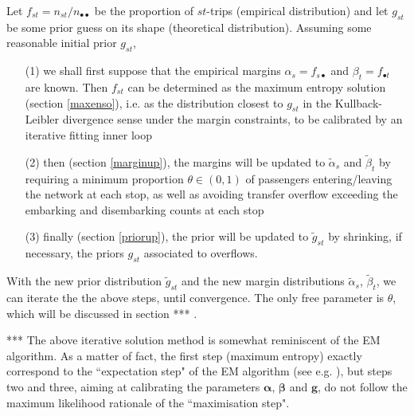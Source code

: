 \documentclass{bmcart}
\begin{document}
Let $f_{st}=n_{st}/n_{\bullet\bullet}$ be the proportion of $st$-trips (empirical distribution) and let $g_{st}$ be some prior guess on its shape (theoretical distribution). 
Assuming some reasonable initial prior $g_{st}$, 
\begin{itemize}
\item[(1)] we shall first suppose that the empirical margins $\alpha_s=f_{s\bullet}$ and $\beta_t=f_{\bullet t}$ are known.  
Then $f_{st}$ can be determined as the maximum entropy solution (section \ref{maxenso}), i.e. as the distribution closest to $g_{st}$ in the Kullback-Leibler divergence sense under the margin constraints, to be calibrated by an iterative fitting inner loop
\item[(2)] then (section \ref{marginup}), the margins will be updated to $\tilde{\alpha}_s$ and $\tilde{\beta}_t$   by requiring a minimum proportion $\theta\in (0,1)$ of passengers entering/leaving the network at each stop, as well as avoiding transfer overflow exceeding the embarking and disembarking counts at each stop
 \item[(3)] finally (section \ref{priorup}), the prior will be updated to $\tilde{g}_{st}$ by shrinking, if necessary, the priors $g_{st}$ associated to overflows. 
\end{itemize}
With the new prior distribution $\widetilde{g}_{st}$ and the new margin distributions $\widetilde{\alpha}_s$, $\widetilde{\beta}_t$, we can iterate the 
 the above steps, until convergence. The only free parameter is $\theta$, which will be discussed in section *** . 
 
 
 *** The above iterative solution method is somewhat reminiscent of the EM algorithm. As a matter of fact, the first  step  (maximum entropy) exactly correspond to the ``expectation step" of the EM algorithm (see e.g. \cite{dempster1977maximum}  \cite{bavaud2009information}), but steps two and three, aiming at calibrating the parameters $\bm{\alpha}$, $\bm{\beta}$ and $\mathbf{g}$, do not follow the maximum likelihood rationale of the ``maximisation step". 
 
\end{document}
